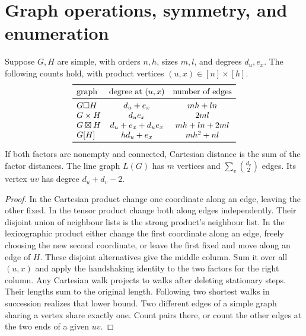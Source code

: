\section{Graph operations, symmetry, and enumeration}\label{sec:ops}
\begin{proposition}\leavevmode\label{prop:products}
Suppose $G,H$ are simple, with orders $n,h$, sizes $m,l$, and degrees $d_u,e_x$.
The following counts hold, with product vertices $(u,x)\in[n]\times[h]$.
\[
\begin{array}{lcc}
\toprule
\text{graph} & \text{degree at }(u,x)&\text{number of edges}\\
\midrule
G\square H &d_u+e_x&mh+ln\\
G\times H &d_u e_x&2ml\\
G\boxtimes H&d_u+e_x+d_u e_x&mh+ln+2ml\\
G[H]&h d_u+e_x&mh^2+nl\\
\bottomrule
\end{array}
\]
If both factors are nonempty and connected, Cartesian distance is the sum
of the factor distances. The line graph $L(G)$ has $m$ vertices and
$\sum_v\binom{d_v}{2}$ edges. Its vertex $uv$ has degree $d_u+d_v-2$.
\end{proposition}
\begin{proof}
In the Cartesian product change one coordinate along an edge, leaving the
other fixed. In the tensor product change both along edges independently.
Their disjoint union of neighbour lists is the strong product's neighbour
list. In the lexicographic product either change the first coordinate along
an edge, freely choosing the new second coordinate, or leave the first fixed
and move along an edge of $H$. These disjoint alternatives give the middle
column. Sum it over all $(u,x)$ and apply the handshaking identity to the two
factors for the right column. Any Cartesian walk projects to walks after
deleting stationary steps. Their lengths sum to the original length. Following
two shortest walks in succession realizes that lower bound. Two different
edges of a simple graph sharing a vertex share exactly one. Count pairs there,
or count the other edges at the two ends of a given $uv$.
\end{proof}

